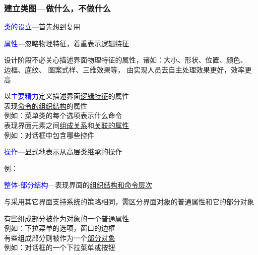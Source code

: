 \documentclass[compress]{beamer}
\begin{document}
\begin{frame}
  \frametitle{建立类图---做什么，不做什么}

   {
  \textcolor{blue}{类的设立}---首先想到\uline{复用} \\[2ex]

}


 {
\textcolor{blue}{属性}---忽略物理特征，着重表示\uline{逻辑特征}

设计阶段\alert{不必关心}描述界面\alert{物理特征}的属性，诸如：大小、形状、位置、颜色、
边框、底纹、 图案式样、三维效果等， 由实现人员去自主处理效果更好，效率更高

以\textcolor{blue}{主要精力}定义描述界面\uline{逻辑特征}的属性 \\
\quad 表现\uline{命令的组织结构}的属性 \\
\qquad 例如：菜单类的每个选项表示什么命令 \\
\quad 表现界面元素之间\uline{组成关系}和\uline{关联的属性} \\
\qquad 例如：对话框中包含哪些控件
}

 {
  \textcolor{blue}{操作}---显式地表示从高层类\uline{继承}的操作

例： \quad\quad

\centering{}
}

 {
  \textcolor{blue}{整体-部分结构}---表现界面的\uline{组织结构和命令层次}

与采用其它界面支持系统的策略相同，需区分界面对象的普通属性和它的部分对象

有些组成部分被作为对象的一个\uline{普通属性} \\
\quad 例如：下拉菜单的选项，窗口的边框 \\
有些组成部分则被作为一个\uline{部分对象} \\
\quad 例如：对话框的一个下拉菜单或按钮 \\[2ex]

}
\end{frame}
\end{document}
